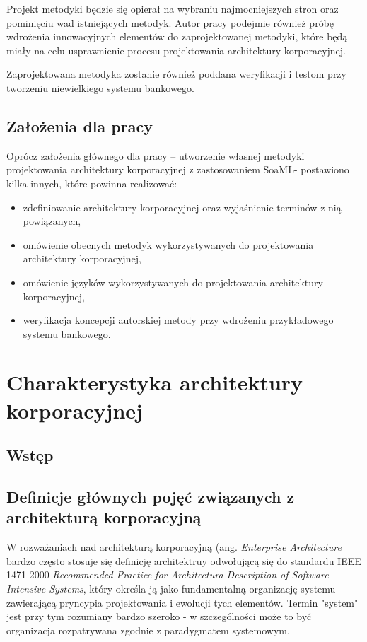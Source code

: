 Projekt metodyki będzie się opierał na wybraniu najmocniejszych stron oraz pominięciu wad istniejących metodyk. Autor pracy podejmie również próbę wdrożenia innowacyjnych elementów do zaprojektowanej metodyki, które będą miały na celu usprawnienie procesu projektowania architektury korporacyjnej.

Zaprojektowana metodyka zostanie również poddana weryfikacji i testom przy tworzeniu niewielkiego systemu bankowego.

\section{Założenia dla pracy}
Oprócz założenia głównego dla pracy – utworzenie własnej metodyki projektowania architektury korporacyjnej z zastosowaniem SoaML- postawiono kilka innych, które powinna realizować:
\begin{itemize}
\item{zdefiniowanie architektury korporacyjnej oraz wyjaśnienie terminów z nią powiązanych,}
\item{omówienie obecnych metodyk wykorzystywanych do projektowania architektury korporacyjnej,}
\item{omówienie języków wykorzystywanych do projektowania architektury korporacyjnej,}
\item{weryfikacja koncepcji autorskiej metody przy wdrożeniu przykładowego systemu bankowego.}
\end{itemize}

\chapter{Charakterystyka architektury korporacyjnej}
\section{Wstęp}
\section{Definicje głównych pojęć związanych z architekturą korporacyjną}
W rozważaniach nad architekturą korporacyjną (ang. \textit{Enterprise Architecture} bardzo często stosuje się definicję architektruy odwołującą się do standardu IEEE 1471-2000 \textit{Recommended Practice for Architectura Description of Software Intensive Systems}, który określa ją jako fundamentalną organizację systemu zawierającą pryncypia projektowania i ewolucji tych elementów. Termin "system" jest przy tym rozumiany bardzo szeroko - w szczególności może to być organizacja rozpatrywana zgodnie z paradygmatem systemowym. 

